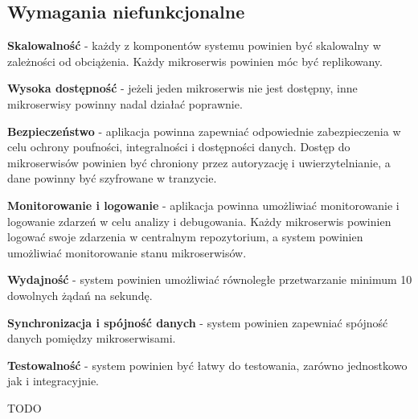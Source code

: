 \subsection{Wymagania niefunkcjonalne}

\textbf{Skalowalność} - każdy z komponentów systemu powinien być skalowalny w zależności od obciążenia. Każdy mikroserwis powinien móc być replikowany.

\textbf{Wysoka dostępność} - jeżeli jeden mikroserwis nie jest dostępny, inne mikroserwisy powinny nadal działać poprawnie.

\textbf{Bezpieczeństwo} - aplikacja powinna zapewniać odpowiednie zabezpieczenia w celu ochrony poufności, integralności i dostępności danych. Dostęp do mikroserwisów powinien być chroniony przez autoryzację i uwierzytelnianie, a dane powinny być szyfrowane w tranzycie.

\textbf{Monitorowanie i logowanie} - aplikacja powinna umożliwiać monitorowanie i logowanie zdarzeń w celu analizy i debugowania. Każdy mikroserwis powinien logować swoje zdarzenia w centralnym repozytorium, a system powinien umożliwiać monitorowanie stanu mikroserwisów.

\textbf{Wydajność} - system powinien umożliwiać równoległe przetwarzanie minimum 10 dowolnych żądań na sekundę.

\textbf{Synchronizacja i spójność danych} - system powinien zapewniać spójność danych pomiędzy mikroserwisami.
    
\textbf{Testowalność} - system powinien być łatwy do testowania, zarówno jednostkowo jak i integracyjnie.

TODO